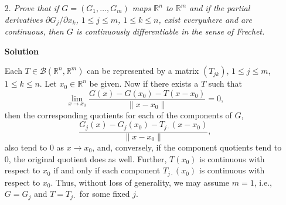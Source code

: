 \documentclass{article}
\begin{document}
\begin{enumerate}
\begin{itemize}
{\bf Solution}

\(G\) is certainly continuous off \((0,0)\).  Around \((0,0)\), change to polar coordinates: \(x = r \cos \theta\), \(y = r \sin \theta\).  Then
\[G(x,y) = \frac{r^2 \cos \theta \sin \theta}{r} \to 0\]
as \(r \to 0\), so since \(G(0,0) = 0\), \(G\) is continuous everywhere.

One can compute that, off \((0,0)\),
\[G_1(x,y) = \frac{y^3}{\left( x^2 + y^2 \right)^{3/2}},\]
\[G_2(x,y) = \frac{x^3}{\left( x^2 + y^2 \right)^{3/2}},\]
both of which certainly exist.  At \((0,0)\),
\[G_1(0,0) = \lim_{\delta \to 0} \frac{G(\delta,0) - G(0,0)}{\delta}
           = \lim_{\delta \to 0} \frac{0 - 0}{\delta}
           = 0,\]
and similarly \(G_2(0,0) = 0\) as well.  Therefore, the partial derivatives of \(G\) exist everywhere.

Each \(T \in \mathcal{B}(\mathbb{R}^2,\mathbb{R}^1)\) can be represented by
\[T(x,y) = T_1 x + T_2 y\]
for \(T_1,T_2 \in \mathbb{R}\).  Hence suppose \(T = G'(0,0)\) existed.  Then \(T\) satisfies
\[\lim_{(x,y) \to (0,0)} \frac{G(x,y) - G(0,0) - T(x,y)}{\|(x,y)\|} = 0.\]
The quotient simplifies to
\[\frac{xy - (T_1x + T_2y) \sqrt{x^2 + y^2}}{x^2 + y^2},\]
and changing to polar coordinates again, this simplifies further to
\[\cos \theta \sin \theta - T_1 \cos \theta - T_2 \sin \theta
  = \frac{1}{2} \sin(2\theta) - T_1 \cos \theta - T_2 \sin \theta,\]
which is never identically zero no matter the choice of \(T_1,T_2\).  Hence the limit as \(r \to 0\) of the above expression, if it even exists, is, at the least, nonzero, meaning no such \(T\) can exist, as originally supposed.  Therefore, \(G\) is not Frechet differentiable at \((0,0)\).



\item[2.] {\em Prove that if \(G = (G_1, \ldots, G_m)\) maps \(\mathbb{R}^n\) to \(\mathbb{R}^m\) and if the partial derivatives \(\partial G_j / \partial x_k\), \(1 \leq j \leq m\), \(1 \leq k \leq n\), exist everywhere and are continuous, then \(G\) is continuously differentiable in the sense of Frechet.}

{\bf Solution}

Each \(T \in \mathcal{B}(\mathbb{R}^n,\mathbb{R}^m)\) can be represented by a matrix \((T_{jk})\), \(1 \leq j \leq m\), \(1 \leq k \leq n\).  Let \(x_0 \in \mathbb{R}^n\) be given.  Now if there exists a \(T\) such that
\[\lim_{x \to x_0} \frac{G(x) - G(x_0) - T(x - x_0)}{\|x - x_0\|} = 0,\]
then the corresponding quotients for each of the components of \(G\),
\[\frac{G_j(x) - G_j(x_0) - T_{j\cdot}(x - x_0)}{\|x - x_0\|},\]
also tend to \(0\) as \(x \to x_0\), and, conversely, if the component quotients tend to \(0\), the original quotient does as well.  Further, \(T(x_0)\) is continuous with respect to \(x_0\) if and only if each component \(T_{j\cdot}(x_0)\) is continuous with respect to \(x_0\).  Thus, without loss of generality, we may assume \(m = 1\), i.e., \(G = G_j\) and \(T = T_{j\cdot}\) for some fixed \(j\).


\end{itemize}
\end{enumerate}
\end{document}
